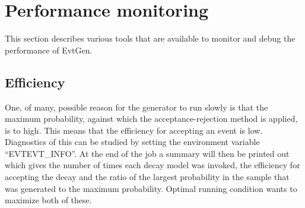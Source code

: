 \section{Performance monitoring}
\label{sect:monitoring}

This section describes various tools that are available to
monitor and debug the performance of EvtGen.

\subsection{Efficiency}
\label{sect:mon_eff}

One, of many, possible reason for the generator to run slowly is that
the maximum probability, against which the acceptance-rejection
method is applied, is to high. This means that the efficiency for
accepting an event is low. Diagnostics of this can be studied by 
setting the environment variable ``EVTEVT_INFO''. At the end of the
job a summary will then be printed out which gives the number of
times each decay model was invoked, the efficiency for accepting
the decay and the ratio of the largest probability in the sample
that was generated to the maximum probability. Optimal running
condition wants to maximize both of these. 


